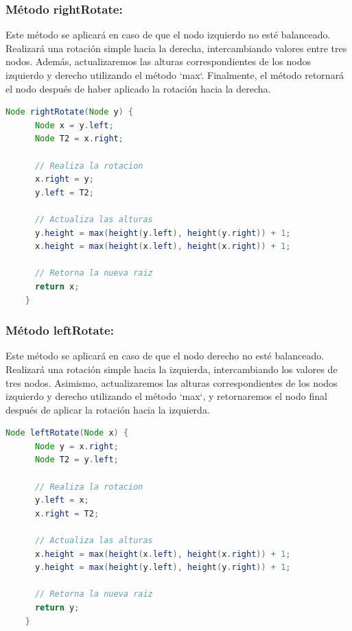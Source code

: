 \documentclass{article}
\begin{document}
  \subsubsection{Método rightRotate: }Este método se aplicará en caso de que el nodo izquierdo no esté balanceado. 
  Realizará una rotación simple hacia la derecha, intercambiando valores entre tres nodos. Además, actualizaremos 
  las alturas correspondientes de los nodos izquierdo y derecho utilizando el método `max`. Finalmente, el método 
  retornará el nodo después de haber aplicado la rotación hacia la derecha.
  \begin{lstlisting}[language=Java, caption={Ejemplo de código Java}]
    Node rightRotate(Node y) {
      Node x = y.left;
      Node T2 = x.right;

      // Realiza la rotacion
      x.right = y;
      y.left = T2;

      // Actualiza las alturas
      y.height = max(height(y.left), height(y.right)) + 1;
      x.height = max(height(x.left), height(x.right)) + 1;

      // Retorna la nueva raiz
      return x;
    }
  \end{lstlisting}
  

  \subsubsection{Método leftRotate: }Este método se aplicará en caso de que el nodo derecho no esté balanceado. 
  Realizará una rotación simple hacia la izquierda, intercambiando los valores de tres nodos. Asimismo, 
  actualizaremos las alturas correspondientes de los nodos izquierdo y derecho utilizando el método `max`, 
  y retornaremos el nodo final después de aplicar la rotación hacia la izquierda.
  \begin{lstlisting}[language=Java, caption={Ejemplo de código Java}]
    Node leftRotate(Node x) {
      Node y = x.right;
      Node T2 = y.left;

      // Realiza la rotacion
      y.left = x;
      x.right = T2;

      // Actualiza las alturas
      x.height = max(height(x.left), height(x.right)) + 1;
      y.height = max(height(y.left), height(y.right)) + 1;

      // Retorna la nueva raiz
      return y;
    }
  \end{lstlisting}
  
\end{document}
